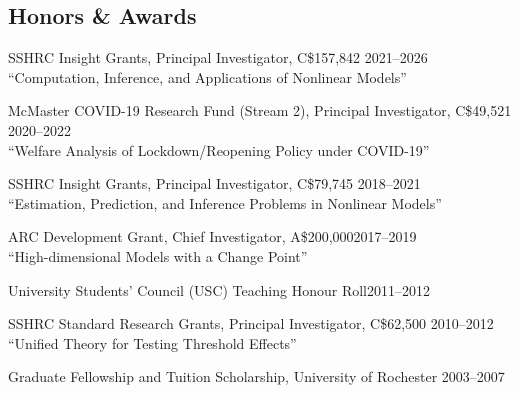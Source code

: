 \documentclass[12pt]{article}
\begin{document}
\subsection*{Honors \& Awards}

\begin{description}
\item \hspace{0.2in}SSHRC Insight Grants, Principal Investigator, C\$157,842 \hfill 2021--2026 \\
\hspace{0.6in}``Computation, Inference, and Applications of Nonlinear Models''

\item \hspace{0.2in}McMaster COVID-19 Research Fund (Stream 2), Principal Investigator, C\$49,521 \hfill 2020--2022 \\
\hspace{0.6in}``Welfare Analysis of Lockdown/Reopening Policy under COVID-19''

\item \hspace{0.2in}SSHRC Insight Grants, Principal Investigator, C\$79,745 \hfill 2018--2021 \\
\hspace{0.6in}``Estimation, Prediction, and Inference Problems in Nonlinear Models''

\item \hspace{0.2in}ARC Development Grant,  Chief Investigator, A\$200,000\hfill 2017--2019\\
\hspace{0.6in}``High-dimensional Models with a Change Point''

\item \hspace{0.2in}University Students' Council (USC) Teaching Honour Roll\hfill 2011--2012

\item \hspace{0.2in}SSHRC Standard Research Grants, Principal Investigator, C\$62,500 \hfill 2010--2012 \\
\hspace{0.6in}``Unified Theory for Testing Threshold Effects''


\item \hspace{0.2in}Graduate Fellowship and Tuition Scholarship, University
of Rochester \hfill 2003--2007


\end{description}
\end{document}
